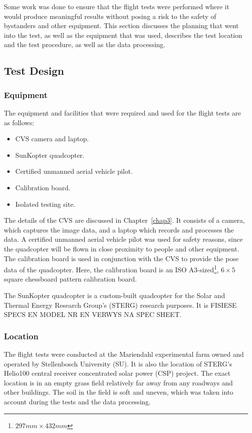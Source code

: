 Some work was done to ensure that the flight tests were performed where it would produce meaningful results without posing a risk to the safety of bystanders and other equipment. This section discusses the planning that went into the test, as well as the equipment that was used, describes the test location and the test procedure, as well as the data processing.  

\subsection{Test Design}

\subsubsection{Equipment}

The equipment and facilities that were required and used for the flight tests are as follows:

\begin{itemize}
    \item CVS camera and laptop.
    \item SunKopter quadcopter.
    \item Certified unmanned aerial vehicle pilot.
    \item Calibration board.
    \item Isolated testing site. 
\end{itemize}

The details of the CVS are discussed in Chapter~\ref{chap3}. It consists of a camera, which captures the image data, and a laptop which records and processes the data. A certified unmanned aerial vehicle pilot was used for safety reasons, since the quadcopter will be flown in close proximity to people and other equipment. The calibration board is used in conjunction with the CVS to provide the pose data of the quadcopter. Here, the calibration board is an ISO A3-sized\footnote{$297mm\times432mm$}, $6\times5$ square chessboard pattern calibration board. 

The SunKopter quadcopter is a custom-built quadcopter for the Solar and Thermal Energy Research Group's (STERG) research purposes. It is FISIESE SPECS EN MODEL NR EN VERWYS NA SPEC SHEET\@.

\subsubsection{Location}

The flight tests were conducted at the Mariendahl experimental farm owned and operated by Stellenbosch University (SU). It is also the location of STERG's Helio100 central receiver concentrated solar power (CSP) project. The exact location is in an empty grass field relatively far away from any roadways and other buildings. The soil in the field is soft and uneven, which was taken into account during the tests and the data processing. 

